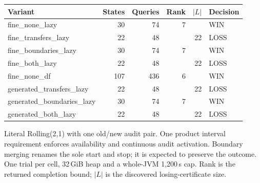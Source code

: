 \begin{tabular}{lrrrrl}
\toprule
Variant & States & Queries & Rank & $|L|$ & Decision \\
\midrule
fine\_none\_lazy & 30 & 74 & 7 &  & WIN \\
fine\_transfers\_lazy & 22 & 48 &  & 22 & LOSS \\
fine\_boundaries\_lazy & 30 & 74 & 7 &  & WIN \\
fine\_both\_lazy & 22 & 48 &  & 22 & LOSS \\
fine\_none\_df & 107 & 436 & 6 &  & WIN \\
generated\_transfers\_lazy & 22 & 48 &  & 22 & LOSS \\
generated\_boundaries\_lazy & 30 & 74 & 7 &  & WIN \\
generated\_both\_lazy & 22 & 48 &  & 22 & LOSS \\
\bottomrule
\end{tabular}
{\par\smallskip\footnotesize Literal Rolling(2,1) with one old/new audit pair. One product interval requirement enforces availability and continuous audit activation. Boundary merging renames the sole start and stop; it is expected to preserve the outcome. One trial per cell, 32\,GiB heap and a whole-JVM 1,200\,s cap. Rank is the returned completion bound; $|L|$ is the discovered losing-certificate size.}
